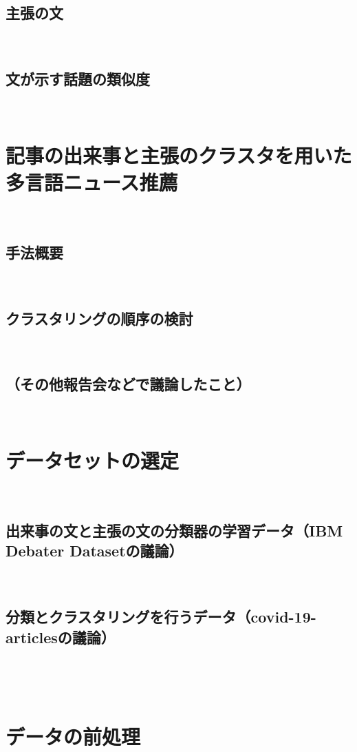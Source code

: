 \documentclass[12pt,a4j]{jreport}
\begin{document}
\subsection{主張の文}
~

\subsection{文が示す話題の類似度}
~

\section{記事の出来事と主張のクラスタを用いた多言語ニュース推薦}
~

\subsection{手法概要}
~

\subsection{クラスタリングの順序の検討}
~

\subsection{（その他報告会などで議論したこと）}
~

\section{データセットの選定}
~

\subsection{出来事の文と主張の文の分類器の学習データ（IBM Debater Datasetの議論）}
~

\subsection{分類とクラスタリングを行うデータ（covid-19-articlesの議論）}
~

~

\section{データの前処理}
~
\end{document}
